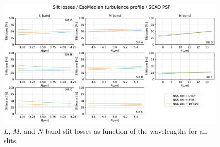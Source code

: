 \begin{landscape}
\begin{figure}[ht!]
  \centering
  \includegraphics[width=1.0\linewidth]{figures/LSS_CrtAlg_files/METIS_slitlosses.pdf}
  \caption{$L$, $M$, and $N$-band slit losses as function of the wavelengths for all slits.}
  \label{fig:slitlosses}
\end{figure}
\end{landscape}




